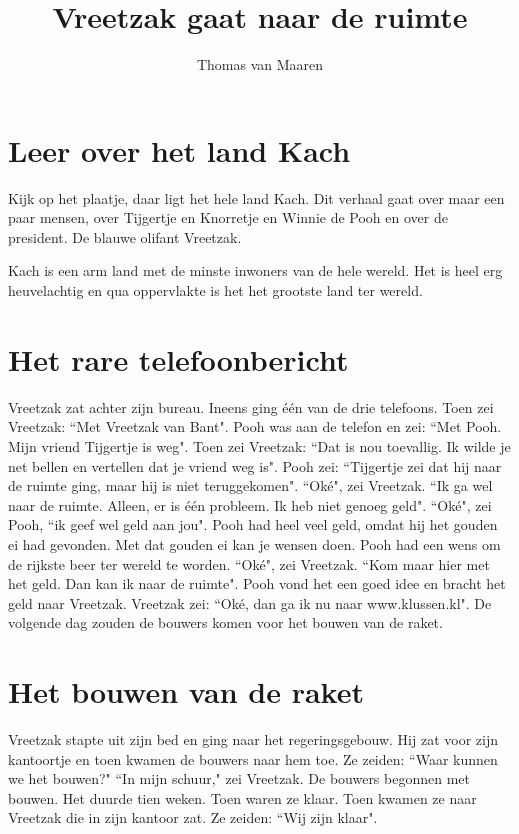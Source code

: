 \documentclass{article}
\title{Vreetzak gaat naar de ruimte}
\author{Thomas van Maaren}
\date{}
\begin{document}
\maketitle

\section{Leer over het land Kach}

Kijk op het plaatje, daar ligt het hele land Kach. Dit verhaal gaat over maar een paar mensen, over Tijgertje en Knorretje en Winnie de Pooh en over de president. De blauwe olifant Vreetzak.

Kach is een arm land met de minste inwoners van de hele wereld. Het is heel erg heuvelachtig en qua oppervlakte is het het grootste land ter wereld.

\section{Het rare telefoonbericht}

Vreetzak zat achter zijn bureau. Ineens ging één van de drie telefoons. Toen zei Vreetzak: ``Met Vreetzak van Bant". Pooh was aan de telefon en zei: ``Met Pooh. Mijn vriend Tijgertje is weg". Toen zei Vreetzak: ``Dat is nou toevallig. Ik wilde je net bellen en vertellen dat je vriend weg is". Pooh zei: ``Tijgertje zei dat hij naar de ruimte ging, maar hij is niet teruggekomen". ``Oké", zei Vreetzak. ``Ik ga wel naar de ruimte. Alleen, er is één probleem. Ik heb niet genoeg geld". ``Oké", zei Pooh, ``ik geef wel geld aan jou". Pooh had heel veel geld, omdat hij het gouden ei had gevonden. Met dat gouden ei kan je wensen doen. Pooh had een wens om de rijkste beer ter wereld te worden. ``Oké", zei Vreetzak. ``Kom maar hier met het geld. Dan kan ik naar de ruimte". Pooh vond het een goed idee en bracht het geld naar Vreetzak. Vreetzak zei: ``Oké, dan ga ik nu naar www.klussen.kl". De volgende dag zouden de bouwers komen voor het bouwen van de raket.

\section{Het bouwen van de raket}

Vreetzak stapte uit zijn bed en ging naar het regeringsgebouw. Hij zat voor zijn kantoortje en toen kwamen de bouwers naar hem toe. Ze zeiden: ``Waar kunnen we het bouwen?" ``In mijn schuur," zei Vreetzak. De bouwers begonnen met bouwen. Het duurde tien weken. Toen waren ze klaar. Toen kwamen ze naar Vreetzak die in zijn kantoor zat. Ze zeiden: ``Wij zijn klaar".
\end{document}
